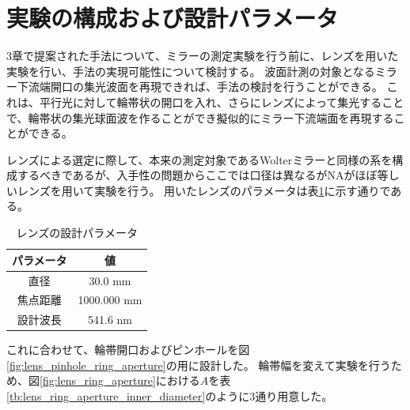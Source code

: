 \documentclass[dvipdfmx,autodetect-engine]{jreport}
\begin{document}
\newpage
\section{実験の構成および設計パラメータ}
3章で提案された手法について、ミラーの測定実験を行う前に、レンズを用いた実験を行い、手法の実現可能性について検討する。
波面計測の対象となるミラー下流端開口の集光波面を再現できれば、手法の検討を行うことができる。
これは、平行光に対して輪帯状の開口を入れ、さらにレンズによって集光することで、輪帯状の集光球面波を作ることができ擬似的にミラー下流端面を再現することができる。

レンズによる選定に際して、本来の測定対象であるWolterミラーと同様の系を構成するべきであるが、入手性の問題からここでは口径は異なるがNAがほぼ等しいレンズを用いて実験を行う。
用いたレンズのパラメータは表\ref{tb:focusing_lens_params}に示す通りである。

\begin{table}[h]
\begin{center}
  \begin{tabular}{|c|c|} \hline
    パラメータ & 値 \\ \hline
    直径 & 30.0 mm  \\
    焦点距離 & 1000.000 mm \\
    設計波長 & 541.6 nm \\ \hline
  \end{tabular}
  \caption{レンズの設計パラメータ}
  \label{tb:focusing_lens_params}
\end{center}
\end{table}

これに合わせて、輪帯開口およびピンホールを図\ref{fig:lens_pinhole_ring_aperture}の用に設計した。
輪帯幅を変えて実験を行うため、図\ref{fig:lens_ring_aperture}における$A$を表\ref{tb:lens_ring_aperture_inner_diameter}のように3通り用意した。
\end{document}
